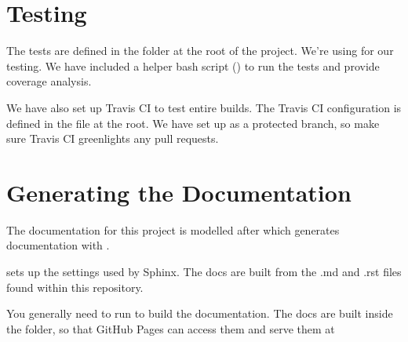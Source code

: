 \documentclass[letterpaper,10pt,english]{sphinxmanual}
\begin{document}
\section{Testing}
\label{\detokenize{readme:testing}}\label{\detokenize{readme:id4}}
The tests are defined in the  folder at the root of the project. We’re
using  for our testing. We have
included a helper bash script () to run the tests and provide
coverage analysis.

We have also set up Travis CI to test entire builds. The Travis CI
configuration is defined in the  file at the root. We have set
up  as a protected branch, so make sure Travis CI greenlights
any pull requests.


\section{Generating the Documentation}
\label{\detokenize{readme:generating-the-documentation}}\label{\detokenize{readme:id5}}
The documentation for this project is modelled after  which generates documentation
with .

 sets up the settings used by Sphinx. The docs are built from the
.md and .rst files found within this repository.

You generally need to run  to build the documentation. The docs
are built inside the  folder, so that GitHub Pages can access them and
serve them at 
\end{document}
